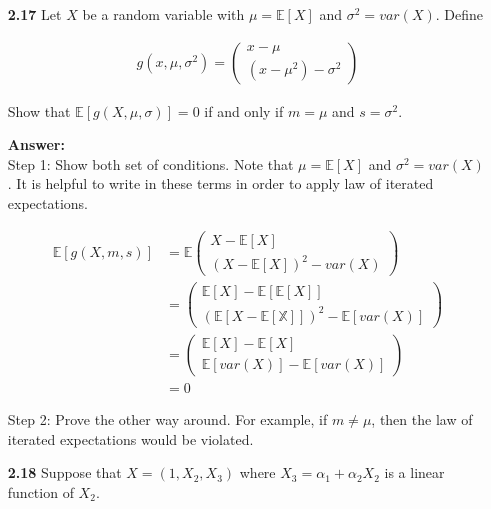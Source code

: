 \documentclass[14pt]{extreport}
\newcommand{\answer}[0]{\medskip \textbf{Answer:} \medskip \\}
\begin{document}
\begin{enumerate}
    \item [\textbf{2.17}] 
    Let \(X\) be a random variable with \(\mu = \mathbb{E}[X]\) and \(\sigma^2 = var(X)\). 
    Define

    \begin{align*}
        g(x, \mu, \sigma^2) = \begin{pmatrix}
            x - \mu \\
            (x - \mu^2) - \sigma^2
        \end{pmatrix}
    \end{align*}

    Show that \(\mathbb{E}[g(X, \mu, \sigma)] = 0\) if and only if \(m = \mu\) and \(s = \sigma^2\).

    \answer
    Step 1: Show both set of conditions. Note that \(\mu = \mathbb{E}[X]\) and \(\sigma^2 = var(X)\).
    It is helpful to write in these terms in order to apply law of iterated expectations.

    \begin{align*}
        \mathbb{E}[g(X, m, s)] &= \mathbb{E}
            \begin{pmatrix}
                X - \mathbb{E}[X] \\
                (X - \mathbb{E}[X])^2 - var(X)
            \end{pmatrix} \\
            &= \begin{pmatrix}
                \mathbb{E}[X] - \mathbb{E}[\mathbb{E}[X]] \\
                (\mathbb{E}[X - \mathbb{E[X]}])^2 - \mathbb{E}[var(X)]
            \end{pmatrix} \\
            &= \begin{pmatrix}
                \mathbb{E}[X] - \mathbb{E}[X] \\
                \mathbb{E}[var(X)] - \mathbb{E}[var(X)]
            \end{pmatrix} \\
            &= 0
    \end{align*}

    Step 2: Prove the other way around.
    \medskip
    For example, if \(m \neq \mu\), then the law of iterated expectations would be violated.


    \item [\textbf{2.18}] Suppose that \( X = (1, X_2, X_3) \) where \( X_3 = \alpha_1 + \alpha_2X_2 \) is a linear function of \( X_2 \). 
    

\end{enumerate}
\end{document}
